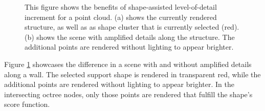     \begin{figure}
        \centering
        \par\medskip
        \caption[Comparison of a scene with and without shape-assisted level-of-detail increment.]
        {This figure shows the benefits of shape-assisted level-of-detail increment for a point cloud. (a) shows the currently rendered structure, as well as as shape cluster that is currently selected (red). (b) shows the scene with amplified details along the structure. The additional points are rendered without lighting to appear brighter.}
        \label{fig:lod_increment}
    \end{figure}
    
    Figure \ref{fig:lod_increment} showcases the difference in a scene with and without amplified details along a wall. The selected support shape is rendered in transparent red, while the additional points are rendered without lighting to appear brighter. In the intersecting octree nodes, only those points are rendered that fulfill the shape's score function. 
    
    
